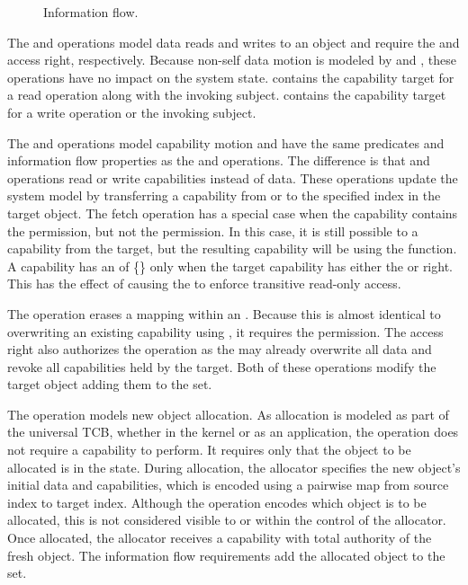 \begin{figure}
  \FIGflow{}
  \caption{Information flow. \label{fig:sketch:flow}}
\end{figure}

The \NMread{} and \NMwrite{} operations model data reads and writes to an object and require the \NMrd{} and \NMwr{} access right, respectively.
Because non-self data motion is modeled by \NMreadFrom{} and \NMwroteTo{}, these operations have no impact on the system state.
\NMreadFrom{} contains the capability target for a read operation along with the invoking subject.
\NMwroteTo{} contains the capability target for a write operation or the invoking subject.

The \NMfetch{} and \NMstore{} operations model capability motion and have the same predicates and information flow properties as the \NMread{} and \NMwrite{} operations.
The difference is that \NMfetch{} and \NMstore{} operations read or write capabilities instead of data.
These operations update the system model by transferring a capability from or to the specified index in the target object.
The fetch operation has a special case when the capability contains the \NMwk{} permission, but not the \NMrd{} permission.
In this case, it is still possible to \NMfetch{} a capability from the target, but the resulting capability will be \TMweakened{} using the \NMweaken{} function.
A \TMweakened{} capability has an \TMaccessRightSet{} of \{\NMwk{}\} only when the target capability has either the \NMrd{} or \NMwk{} right.
This has the effect of causing the \NMwk{} \TMaccessRight{} to enforce transitive read-only access.

The \TMrevoke{} operation erases a mapping within an \TMobj{}.
Because this is almost identical to overwriting an existing capability using \NMstore{}, it requires the \NMwr{} permission.
The \NMwr{} access right also authorizes the \TMdestroy{} operation as the \TMactor{} may already overwrite all data and revoke all capabilities held by the target.
Both of these operations modify the target object adding them to the \NMwroteTo{} set.

The \NMcreate{} operation models new object allocation.
As allocation is modeled as part of the universal TCB, whether in the kernel or as an application, the \NMcreate{} operation does not require a capability to perform.
It requires only that the object to be allocated is in the \NMunborn{} state.
During allocation, the allocator specifies the new object's initial data and capabilities, which is encoded using a pairwise map from source index to target index.
Although the operation encodes which object is to be allocated, this is not considered visible to or within the control of the allocator.
Once allocated, the allocator receives a capability with total authority of the fresh object.
The information flow requirements add the allocated object to the \NMwroteTo{} set.

